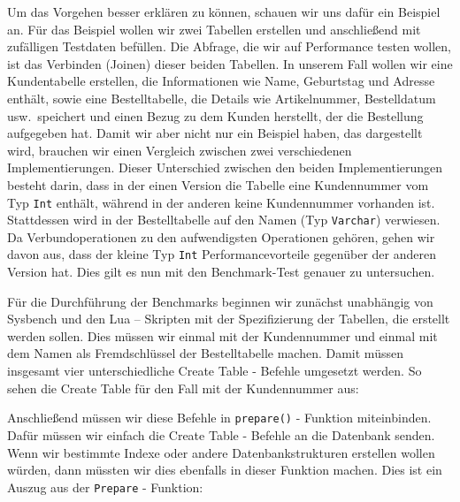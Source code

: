 Um das Vorgehen besser erklären zu können, schauen wir uns dafür ein Beispiel an.
Für das Beispiel wollen wir zwei Tabellen erstellen und anschließend mit zufälligen Testdaten befüllen.
Die Abfrage, die wir auf Performance testen wollen, ist das Verbinden (Joinen) dieser beiden Tabellen.
In unserem Fall wollen wir eine Kundentabelle erstellen, die Informationen wie Name, Geburtstag und Adresse enthält, sowie eine Bestelltabelle, die Details wie Artikelnummer, Bestelldatum usw.\ speichert und einen Bezug zu dem Kunden herstellt, der die Bestellung aufgegeben hat.
Damit wir aber nicht nur ein Beispiel haben, das dargestellt wird, brauchen wir einen Vergleich zwischen zwei verschiedenen Implementierungen.
Dieser Unterschied zwischen den beiden Implementierungen besteht darin, dass in der einen Version die Tabelle eine Kundennummer vom Typ \texttt{Int} enthält, während in der anderen keine Kundennummer vorhanden ist.
Stattdessen wird in der Bestelltabelle auf den Namen (Typ \texttt{Varchar}) verwiesen.
Da Verbundoperationen zu den aufwendigsten Operationen gehören, gehen wir davon aus, dass der kleine Typ \texttt{Int} Performancevorteile gegenüber der anderen Version hat.
Dies gilt es nun mit den Benchmark-Test genauer zu untersuchen.

Für die Durchführung der Benchmarks beginnen wir zunächst unabhängig von Sysbench und den Lua – Skripten mit der Spezifizierung der Tabellen, die erstellt werden sollen.
Dies müssen wir einmal mit der Kundennummer und einmal mit dem Namen als Fremdschlüssel der Bestelltabelle machen.
Damit müssen insgesamt vier unterschiedliche Create Table - Befehle umgesetzt werden.
So sehen die Create Table für den Fall mit der Kundennummer aus:





Anschließend müssen wir diese Befehle in \texttt{prepare()} - Funktion miteinbinden.
Dafür müssen wir einfach die Create Table - Befehle an die Datenbank senden.
Wenn wir bestimmte Indexe oder andere Datenbankstrukturen erstellen wollen würden, dann müssten wir dies ebenfalls in dieser Funktion machen.
Dies ist ein Auszug aus der \texttt{Prepare} - Funktion:

